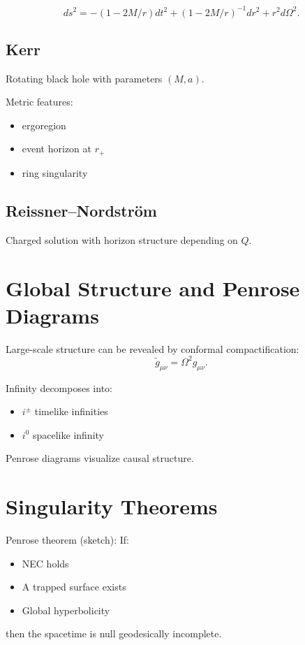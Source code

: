 \documentclass[12pt]{article}
\begin{document}
\[
ds^2 = -(1-2M/r)dt^2 + (1-2M/r)^{-1}dr^2 + r^2d\Omega^2.
\]

\subsection{Kerr}

Rotating black hole with parameters $(M,a)$.

Metric features:
\begin{itemize}
\item ergoregion
\item event horizon at $r_+$ 
\item ring singularity
\end{itemize}

\subsection{Reissner--Nordström}

Charged solution with horizon structure depending on $Q$.

\section{Global Structure and Penrose Diagrams}

Large-scale structure can be revealed by conformal compactification:
\[
\tilde{g}_{\mu\nu} = \Omega^2 g_{\mu\nu}.
\]

Infinity decomposes into:
\begin{itemize}
\item $i^\pm$ timelike infinities
\item $i^0$ spacelike infinity
\end{itemize}

Penrose diagrams visualize causal structure.

\section{Singularity Theorems}

Penrose theorem (sketch):  
If:
\begin{itemize}
\item NEC holds
\item A trapped surface exists
\item Global hyperbolicity
\end{itemize}
then the spacetime is null geodesically incomplete.
\end{document}
